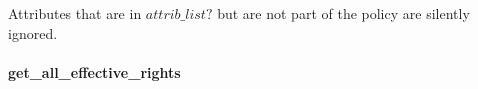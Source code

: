 Attributes that are in $attrib\_list?$ but are not part of the policy are
silently ignored.

\paragraph{get\_all\_effective\_rights}

